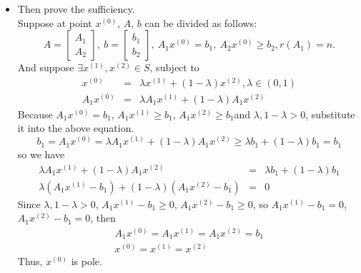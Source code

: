 \documentclass[paper=a4, fontsize=11pt]{scrartcl} %
\numberwithin{equation}{section} %
\numberwithin{figure}{section} %
\numberwithin{table}{section} %
\begin{document}
\begin{itemize}
\item Then prove the sufficiency.\\
Suppose at point $x^{(0)}$, $A$, $b$ can be divided as follows:
\begin{equation}  \nonumber
A = \begin{bmatrix} A_1 \\ A_2 \end{bmatrix}, \ b = \begin{bmatrix} b_1 \\ b_2 \end{bmatrix}, \ A_1x^{(0)} = b_1,\ A_2x^{(0)} \geq b_2, r(A_1)=n.
\end{equation}
And suppose $\exists x^{(1)}, x^{(2)} \in S$, subject to
\begin{equation}  \nonumber
\begin{array}{rcl}
x^{(0)} &=& \lambda x^{(1)} +(1-\lambda)x^{(2)}, \lambda \in (0,1)\\
A_1x^{(0)}&=& \lambda A_1x^{(1)} +(1-\lambda)A_1x^{(2)}
\end{array}
\end{equation}
Because $A_1x^{(0)}=b_1$, $A_1x^{(1)}\geq b_1$, $A_1x^{(2)}\geq b_1$and $\lambda,1-\lambda>0$, substitute it into the above equation.
\begin{equation}  \nonumber
b_1 = A_1x^{(0)} = \lambda A_1x^{(1)}+(1-\lambda)A_1x^{(2)} \geq \lambda b_1+(1-\lambda)b_1=b_1
\end{equation}
so we have
\begin{equation}  \nonumber
\begin{array}{rcl}
\lambda A_1x^{(1)}+(1-\lambda)A_1x^{(2)} &=&\lambda b_1+(1-\lambda)b_1 \\
\lambda(A_1x^{(1)}-b_1)+(1-\lambda)(A_1x^{(2)}-b_1)&=&0
\end{array}
\end{equation}
Since $\lambda, 1-\lambda>0$, $A_1x^{(1)}-b_1\geq0$, $A_1x^{(2)}-b_1\geq0$, so $A_1x^{(1)}-b_1=0$, $A_1x^{(2)}-b_1=0$, then 
\begin{equation}  \nonumber
\begin{array}{rcl}
A_1x^{(0)}=A_1x^{(1)}=A_1x^{(2)}=b_1\\
x^{(0)}=x^{(1)}=x^{(2)}
\end{array}
\end{equation}
Thus, $x^{(0)}$ is pole.
\end{itemize}
\end{document}
